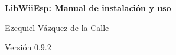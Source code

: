 
\begin{titlepage}
  \begin{center}

    \vspace{3.0cm}
    
    \Large{\textbf{LibWiiEsp: Manual de instalación y uso}} \\
    
    \vspace{1.5cm}

    \Large{Ezequiel Vázquez de la Calle} \\

    \vspace{1.0cm}

	\small{Versión 0.9.2} \\

  \end{center}
\end{titlepage}
